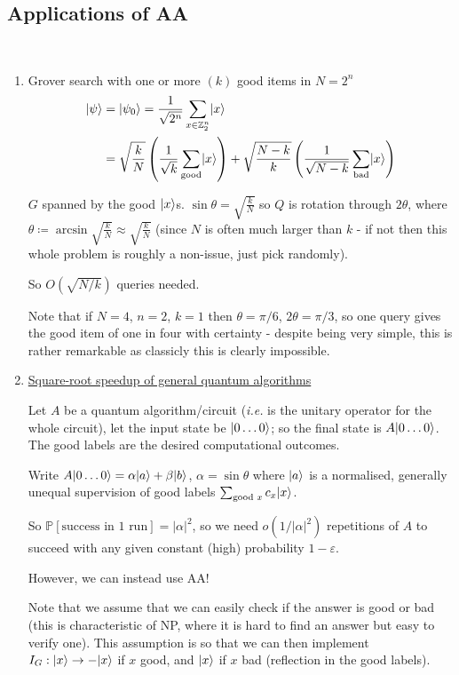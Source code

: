 \documentclass[]{article}
\DeclarePairedDelimiter\ket{\lvert}{\rangle}
\theoremstyle{custhm}
\theoremstyle{cusdef}
\theoremstyle{custhm}
\theoremstyle{custhm}
\theoremstyle{custhm}
\theoremstyle{custhm}
\theoremstyle{cusdef}
\theoremstyle{remark}
\newcommand{\Z}{\mathbb{Z}}
\newcommand{\ra}{\rightarrow}
\newcommand{\eps}{\varepsilon}
\renewcommand{\P}{\mathbb{P}}
\begin{document}
\subsection*{Applications of AA}
\ 
\begin{enumerate}
	\item Grover search with one or more $(k)$ good items in $N = 2^n$
	\begin{align*}
		\ket{\psi} &= \ket{\psi_0} = \frac{1}{\sqrt{2^n}}\sum_{x\in \Z_2^n}\ket{x}\\
		&= \sqrt{\frac{k}{N}}\left(\frac{1}{\sqrt{k}}\sum_{\textrm{good}}\ket{x}\right) + \sqrt{\frac{N-k}{k}}\left(\frac{1}{\sqrt{N-k}}\sum_{\textrm{bad}}\ket{x}\right)
	\end{align*}

	$G$ spanned by the good $\ket{x}$s. $\sin\theta = \sqrt{\frac{k}{N}}$ so $Q$ is rotation through $2\theta$, where $\theta\coloneqq \arcsin\sqrt{\frac{k}{N}} \approx \sqrt{\frac{k}{N}}$ (since $N$ is often much larger than $k$ - if not then this whole problem is roughly a non-issue, just pick randomly).

	So $O(\sqrt{N/k})$ queries needed.

	Note that if $N = 4$, $n = 2$, $k = 1$ then $\theta = \pi/6$, $2\theta = \pi/3$, so one query gives the good item of one in four with certainty - despite being very simple, this is rather remarkable as classicly this is clearly impossible.


	\item \underline{Square-root speedup of general quantum algorithms}
	
	Let $A$ be a quantum algorithm/circuit (\textit{i.e.} is the unitary operator for the whole circuit), let the input state be $\ket{0\dots0}$; so the final state is $A\ket{0\dots0}$. The good labels are the desired computational outcomes.

	Write $A\ket{0\dots 0} = \alpha\ket{a} + \beta\ket{b}$, $\alpha = \sin\theta$ where $\ket{a}$ is a normalised, generally unequal supervision of good labels $\sum_{\textrm{good }x}c_x\ket{x}$.

	So $\P[\textrm{success in 1 run}] = |\alpha|^2$, so we need $o(1/|\alpha|^2)$ repetitions of $A$ to succeed with any given constant (high) probability $1 - \eps$.

	However, we can instead use AA!

	Note that we assume that we can easily check if the answer is good or bad (this is characteristic of NP, where it is hard to find an answer but easy to verify one). This assumption is so that we can then implement $I_G:\ket{x}\ra -\ket{x}$ if $x$ good, and $\ket{x}$ if $x$ bad (reflection in the good labels).


\end{enumerate}
\end{document}
